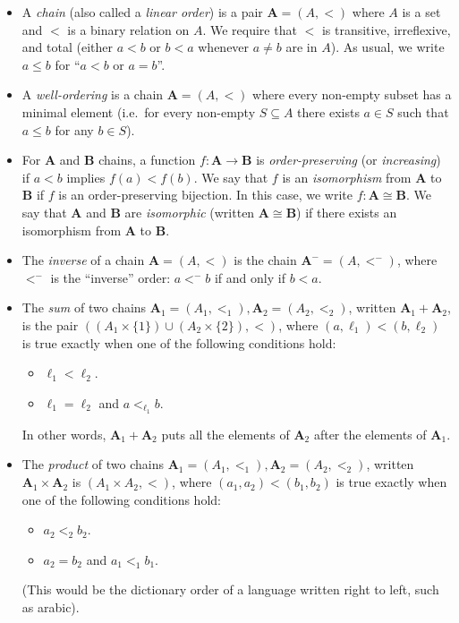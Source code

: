 \documentclass{amsart}
\theoremstyle{definition}
\newcommand{\bA}{\mathbf{A}}
\begin{document}
\begin{itemize}
\item A \emph{chain} (also called a \emph{linear order}) is a pair $\mathbf{A} = (A, <)$ where $A$ is a set and $<$ is a binary relation on $A$. We require that $<$ is transitive, irreflexive, and total (either $a < b$ or $b < a$ whenever $a \neq b$ are in $A$). As usual, we write $a \le b$ for ``$a < b$ or $a = b$''.
\item A \emph{well-ordering} is a chain $\bA = (A, <)$ where every non-empty subset has a minimal element (i.e.\ for every non-empty $S \subseteq A$ there exists $a \in S$ such that $a \le b$ for any $b \in S$). 
  \item For $\mathbf{A}$ and $\mathbf{B}$ chains, a function $f: \mathbf{A} \to \mathbf{B}$ is \emph{order-preserving} (or \emph{increasing}) if $a < b$ implies $f (a) < f (b)$. We say that $f$ is an \emph{isomorphism} from $\mathbf{A}$ to $\mathbf{B}$ if $f$ is an order-preserving bijection. In this case, we write $f: \mathbf{A} \cong \mathbf{B}$. We say that $\mathbf{A}$ and $\mathbf{B}$ are \emph{isomorphic} (written $\mathbf{A} \cong \mathbf{B}$) if there exists an isomorphism from $\mathbf{A}$ to $\mathbf{B}$.
  \item The \emph{inverse} of a chain $\bA = (A, <)$ is the chain $\bA^- = (A, <^-)$, where $<^-$ is the ``inverse'' order: $a <^- b$ if and only if $b < a$.
  \item The \emph{sum} of two chains $\mathbf{A}_1 = (A_1, <_1), \mathbf{A}_2 = (A_2, <_2)$, written $\mathbf{A}_1 + \mathbf{A}_2$, is the pair $((A_1 \times \{1\}) \cup (A_2 \times \{2\}), <)$, where $(a, \ell_1) < (b, \ell_2)$ is true exactly when one of the following conditions hold:
    \begin{itemize}
    \item $\ell_1 < \ell_2$.
    \item $\ell_1 = \ell_2$ and $a <_{\ell_1} b$.
    \end{itemize}

    In other words, $\mathbf{A}_1 + \mathbf{A}_2$ puts all the elements of $\mathbf{A}_2$ after the elements of $\mathbf{A}_1$.
  \item The \emph{product} of two chains $\mathbf{A}_1 = (A_1, <_1), \mathbf{A}_2 = (A_2, <_2)$, written $\mathbf{A}_1 \times \mathbf{A}_2$ is $(A_1 \times A_2, <)$, where $(a_1, a_2) < (b_1, b_2)$ is true exactly when one of the following conditions hold:

    \begin{itemize}
    \item $a_2 <_2 b_2$.
    \item $a_2 = b_2$ and $a_1 <_1 b_1$.
    \end{itemize}

    (This would be the dictionary order of a language written right to left, such as arabic).
\end{itemize}
\end{document}
